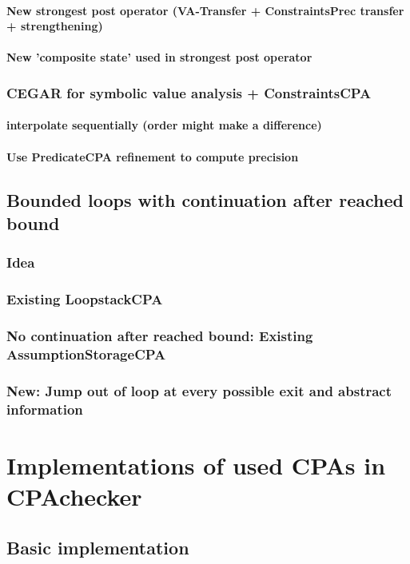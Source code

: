 \documentclass[a4paper,11pt]{article}
\begin{document}
\paragraph{New strongest post operator (VA-Transfer + ConstraintsPrec transfer + strengthening)}
\paragraph{New 'composite state' used in strongest post operator}
\subsubsection{CEGAR for symbolic value analysis + ConstraintsCPA}
\paragraph{interpolate sequentially (order might make a difference)}
\paragraph{Use PredicateCPA refinement to compute precision}

\subsection{Bounded loops with continuation after reached bound}
\subsubsection{Idea}
\subsubsection{Existing LoopstackCPA}
\subsubsection{No continuation after reached bound: Existing AssumptionStorageCPA}
\subsubsection{New: Jump out of loop at every possible exit and abstract information}

\section{Implementations of used CPAs in CPAchecker}
\subsection{Basic implementation}
\end{document}
